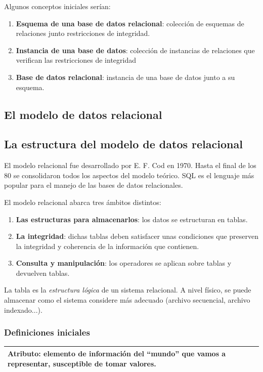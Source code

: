 \documentclass[10pt,a4paper,spanish]{report}
\begin{document}
Algunos conceptos iniciales serían:
\begin{enumerate}[$\heartsuit$]
    \item \textbf{\textcolor[rgb]{1,0.2,0.3}{Esquema de una base de datos relacional}}: colección de esquemas de relaciones junto restricciones de integridad.
    \item \textcolor[rgb]{1,0.2,0.3}{\textbf{Instancia de una base de datos}}: colección de instancias de relaciones que verifican las restricciones de integridad
    \item \textcolor[rgb]{1,0.2,0.3}{\textbf{Base de datos relacional}}: instancia de una base de datos junto a su esquema.
\end{enumerate}

\textcolor[rgb]{1,0.2,0.3}{\chapter{El modelo de datos relacional}}
\textcolor[rgb]{1,0.2,0.3}{\section{La estructura del modelo de datos relacional}}
El modelo relacional fue desarrollado por E. F. Cod en 1970. Hasta el final de los 80 se consolidaron todos los aspectos del modelo teórico. SQL es el lenguaje más popular para el manejo de las bases de datos relacionales.

El modelo relacional abarca tres ámbitos distintos:
\begin{enumerate}[$\heartsuit$]
    \item \textcolor[rgb]{1,0.2,0.3}{\textbf{Las estructuras para almacenarlos}}: los datos se estructuran en tablas.
    \item \textcolor[rgb]{1,0.2,0.3}{\textbf{La integridad}}: dichas tablas deben satisfacer unas condiciones que preserven la integridad y coherencia de la información que contienen.
    \item \textcolor[rgb]{1,0.2,0.3}{\textbf{Consulta y manipulación}}: los operadores se aplican sobre tablas y devuelven tablas.
\end{enumerate}

La tabla es la \textit{\textcolor[rgb]{1,0.2,0.3}{estructura lógica}} de un sistema relacional. A nivel físico, se puede almacenar como el sistema considere más adecuado (archivo secuencial, archivo indexado...).

\textcolor[rgb]{1,0.2,0.3}{\subsection{Definiciones iniciales}}
\begin{center}
\begin{tabular}{|p{12cm}|}
\hline
\textcolor[rgb]{1,0.2,0.3}{\textbf{Atributo}}: elemento de información del ``mundo'' que vamos a representar, susceptible de tomar valores. \\
\hline
\end{tabular}
\end{center}
\end{document}
